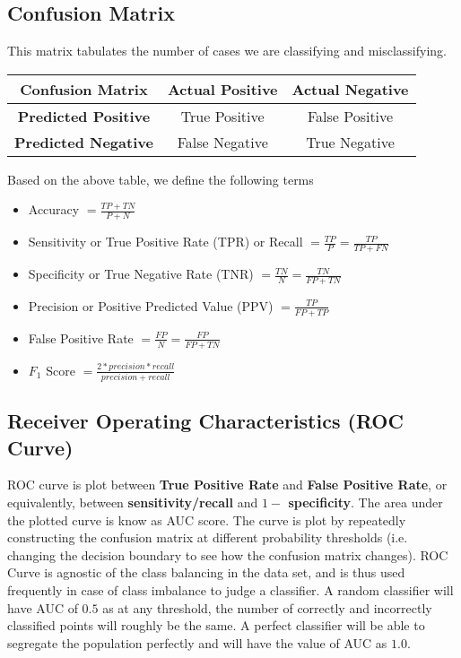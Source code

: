 \documentclass[../statistical_learning_notes.tex]{subfiles}
\begin{document}
    \subsection{Confusion Matrix}
    This matrix tabulates the number of cases we are classifying and misclassifying.
    \begin{table}[h]
    \centering
    \begin{tabular}{c|c|c}
        Confusion Matrix & \textbf{Actual Positive} & \textbf{Actual Negative}\\ \hline
        \textbf{Predicted Positive} & True Positive & False Positive\\ \hline
        \textbf{Predicted Negative} & False Negative & True Negative\\
    \end{tabular}
    \end{table}

    Based on the above table, we define the following terms
    \begin{itemize}
        \item Accuracy $= \frac{TP + TN}{P+N}$
        \item Sensitivity or True Positive Rate (TPR) or Recall $= \frac{TP}{P} = \frac{TP}{TP+FN}$
        \item Specificity or True Negative Rate (TNR) $= \frac{TN}{N} = \frac{TN}{FP+TN}$
        \item Precision or Positive Predicted Value (PPV) $= \frac{TP}{FP+TP}$
        \item False Positive Rate $= \frac{FP}{N} = \frac{FP}{FP+TN}$
        \item $F_{1}$ Score $= \frac{2 * precision * recall}{precision + recall}$
    \end{itemize}

    \subsection{Receiver Operating Characteristics (ROC Curve)}
    ROC curve is plot between \textbf{True Positive Rate} and \textbf{False Positive Rate}, or equivalently, between \textbf{sensitivity/recall} and \textbf{$1 - $ specificity}. The area under the plotted curve is know as AUC score. \newline
    The curve is plot by repeatedly constructing the confusion matrix at different probability thresholds (i.e. changing the decision boundary to see how the confusion matrix changes).\newline
    ROC Curve is agnostic of the class balancing in the data set, and is thus used frequently in case of class imbalance to judge a classifier. A random classifier will have AUC of $0.5$ as at any threshold, the number of correctly and incorrectly classified points will roughly be the same. A perfect classifier will be able to segregate the population perfectly and will have the value of AUC as $1.0$.
\end{document}
